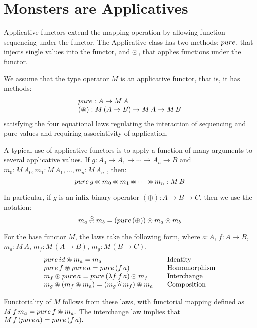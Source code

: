 \section{Monsters are Applicatives}

Applicative functors \cite{mcbride/paterson:2008}
extend the mapping operation by allowing function sequencing under the functor.
The Applicative class has two methods: $\apure$, that injects single values into the functor, and $\circledast$, that applies functions under the functor.

We assume that the type operator $M$ is an applicative functor, that is, it has methods:
$$
\begin{array}{l}
\apure : A \rightarrow M\,A\\
(\appl): M\,(A\rightarrow B) \rightarrow M\,A \rightarrow M\,B
\end{array}
$$
satisfying the four equational laws regulating the interaction of sequencing and pure values and requiring associativity of application.

A typical use of applicative functors is to apply a function of many arguments to several applicative values.
If $g:A_0\rightarrow A_1 \rightarrow \cdots \rightarrow A_n \rightarrow B$ and $m_0:M\,A_0, m_1:M\,A_1, \ldots, m_n:M\,A_n$ , then:
$$
\apure\,g \appl m_0 \appl m_1 \appl \cdots \appl m_n : M\,B
$$

In particular, if $g$ is an infix binary operator $(\oplus) : A \rightarrow B \rightarrow C$, then we use the notation:
$$
m_a \alift{\oplus} m_b = (\apure\,(\oplus)) \appl m_a \appl m_b
$$

For the base functor $M$, the laws take the following form, where
 $a:A$, $f:A\rightarrow B$,
$m_a:M\,A$, $m_f:M\,(A\rightarrow B)$, $m_g:M\,(B\rightarrow C)$.
$$
\begin{array}{l@{\qquad}l}
\apure\,\id \appl m_a = m_a
  & \mbox{Identity} \\
\apure\,f \appl \apure\,a = \apure\,(f\,a)
  & \mbox{Homomorphism} \\
m_f \appl \apure\,a = \apure\,(\lambda f. f\,a) \appl m_f
  & \mbox{Interchange} \\
m_g \appl (m_f \appl m_a) = (m_g \alift{\comp} m_f) \appl m_a
  & \mbox{Composition}
\end{array}
$$

Functoriality of $M$ follows from these laws, with functorial mapping defined as
$
M\,f\,m_a = \apure\,f \appl m_a.
$
The interchange law implies that
$
M\,f\,(\apure\,a) = \apure\,(f\,a).
$


